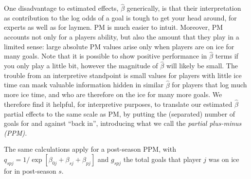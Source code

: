 One disadvantage to estimated effects, $\hat{\beta}$ generically, is that
their interpretation as contribution to the log odds of a goal is tough to get
your head around, for experts as well as for laymen.  PM is much easier to
intuit. Moreover, PM accounts not only for a players ability, but also the
amount that they play in a limited sense: large absolute PM values arise only
when players are on ice for many goals.  Note that it is possible to show
positive performance in $\hat{\beta}$ terms if you only play a little bit,
however the magnitude of $\hat{\beta}$ will likely be small.  The trouble from
an interpretive standpoint is small values for players with little ice time
can mask valuable information hidden in similar $\hat{\beta}$ for players that
log much more ice time, and who are therefore on the ice for many more goals.
We therefore find it helpful, for interpretive purposes, to translate our
estimated $\hat{\beta}$ partial effects to the same scale as PM, by putting
the (separated) number of goals for and against ``back in'', introducing what
we call the {\em partial plus-minus (PPM).}

The same calculations apply for a post-season PPM, with $q_{spj} =
1/\exp[\beta_{0j} + \beta_{sj}+ \beta_{pj}]$ and $g_{spj}$ the total goals
that player $j$ was on ice for in post-season $s$.

